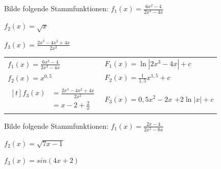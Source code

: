 \begin{frage}Bilde folgende Stammfunktionen: 
	\flushleft 
	$f_1(x)=\frac{6x^2-4}{2x^3-4x}$
	
	\bigskip
	$f_2(x)=\sqrt{x}$
	
	\bigskip
	$f_3(x)=\frac{2x^3-4x^2+4x}{2x^2}$\end{frage}
\begin{antwort}\begin{center}
	\begin{tabularx}{\textwidth}{>{\raggedright\arraybackslash}X | >{\raggedright\arraybackslash}X}
		\multicolumn{1}{c|}{$f(x)$} & \multicolumn{1}{c}{$F(x)$} \\
		\hline
		$f_1(x) = \frac{6x^2-4}{2x^3-4x}$ & $F_1(x) = \ln|2x^3-4x| + c$ \\[3ex]
		
		$f_2(x) = x^{0,5}$ & $F_2(x) = \frac{1}{1,5}x^{1,5} + c$ \\[3ex]
		
		$\begin{aligned}[t]
			f_3(x) &= \frac{2x^3-4x^2+4x}{2x^2} \\
			&= x-2+\frac{2}{x}
		\end{aligned}$ & $F_3(x) = 0,5x^2-2x$ \newline $+2\ln|x| + c$ \\
	\end{tabularx}
\end{center}\end{antwort}
\begin{frage}Bilde folgende Stammfunktionen: 
	\flushleft 
	$f_1(x)=\frac{2x-4}{2x^2-8x}$
	
	\bigskip
	$f_2(x)=\sqrt{7x-1}$
	
	\bigskip
	$f_3(x)=sin(4x+2)$\end{frage}
